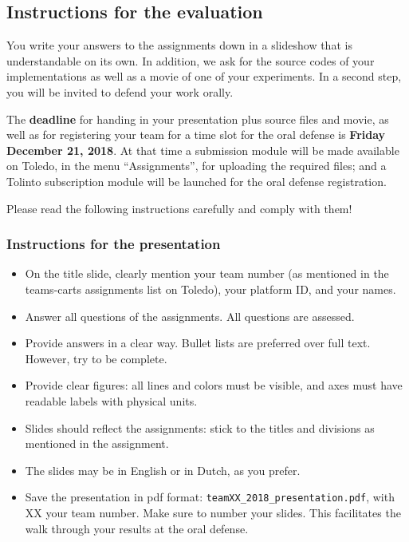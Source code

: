 \documentclass[10pt,a4paper]{article}
\begin{document}
\subsection{Instructions for the evaluation}
You write your answers to the assignments down in a slideshow that is understandable on its own. In addition, we ask for the source codes of your implementations as well as a movie of one of your experiments. In a second step, you will be invited to defend your work orally.

The \textbf{deadline} for handing in your presentation plus source files and movie, as well as for registering your team for a time slot for the oral defense is \textbf{Friday December 21, 2018}. At that time a submission module will be made available on Toledo, in the menu ``Assignments'', for uploading the required files; and a Tolinto subscription module will be launched for the oral defense registration.

Please read the following instructions carefully and comply with them!

\subsubsection*{Instructions for the presentation}
	\begin{itemize}
	\item On the title slide, clearly mention your team number (as mentioned in the teams-carts assignments list on Toledo), your platform ID, and your names.
  \item Answer all questions of the assignments. All questions are assessed.
  \item Provide answers in a clear way. Bullet lists are preferred over full text. However, try to be complete.
  \item Provide clear figures: all lines and colors must be visible, and axes must have readable labels with physical units.
  \item Slides should reflect the assignments: stick to the titles and divisions as mentioned in the assignment.
	\item The slides may be in English or in Dutch, as you prefer.
	\item Save the presentation in pdf format: \verb"teamXX_2018_presentation.pdf", with XX your team number. Make sure to number your slides. This facilitates the walk through your results at the oral defense.
	\end{itemize}
\end{document}
